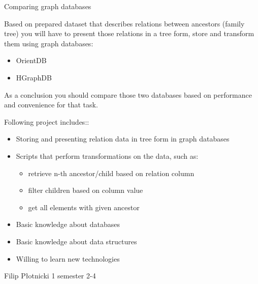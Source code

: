 \begin{project}
{Comparing graph databases}
{Based on prepared dataset that describes relations between ancestors (family tree) you will have to present those relations in a tree form, store and transform them using graph databases:
\begin{itemize}
	\item OrientDB
	\item HGraphDB
\end{itemize}
As a conclusion you should compare those two databases based on performance and convenience for that task.
}
{
Following project includes::
\begin{itemize}
	\item Storing and presenting relation data in tree form in graph databases
	\item Scripts that perform transformations on the data, such as:
		\begin{itemize}
			\item retrieve n-th ancestor/child based on relation column
			\item filter children based on column value
			\item get all elements with given ancestor
		\end{itemize}
\end{itemize}
}
{
\begin{itemize}
	\item Basic knowledge about databases
	\item Basic knowledge about data structures
	\item Willing to learn new technologies
\end{itemize}
}
{Filip Płotnicki}
{1 semester}
{2-4}
\end{project}
